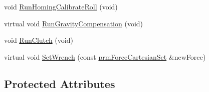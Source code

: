 \begin{DoxyCompactItemize}
\item 
void \hyperlink{classmts_intuitive_research_kit_m_t_m_a287fc386c6c87a6612f0800cc596eacc}{Run\-Homing\-Calibrate\-Roll} (void)
\item 
virtual void \hyperlink{classmts_intuitive_research_kit_m_t_m_a42fefd035b901c97d018cb3360f18cde}{Run\-Gravity\-Compensation} (void)
\item 
void \hyperlink{classmts_intuitive_research_kit_m_t_m_a7ce7066c3edf0865eadc32cfa2a76fad}{Run\-Clutch} (void)
\item 
virtual void \hyperlink{classmts_intuitive_research_kit_m_t_m_a28cc15f8f172bba79bbc00c161a0e6d7}{Set\-Wrench} (const \hyperlink{classprm_force_cartesian_set}{prm\-Force\-Cartesian\-Set} \&new\-Force)
\end{DoxyCompactItemize}
\subsection*{Protected Attributes}
